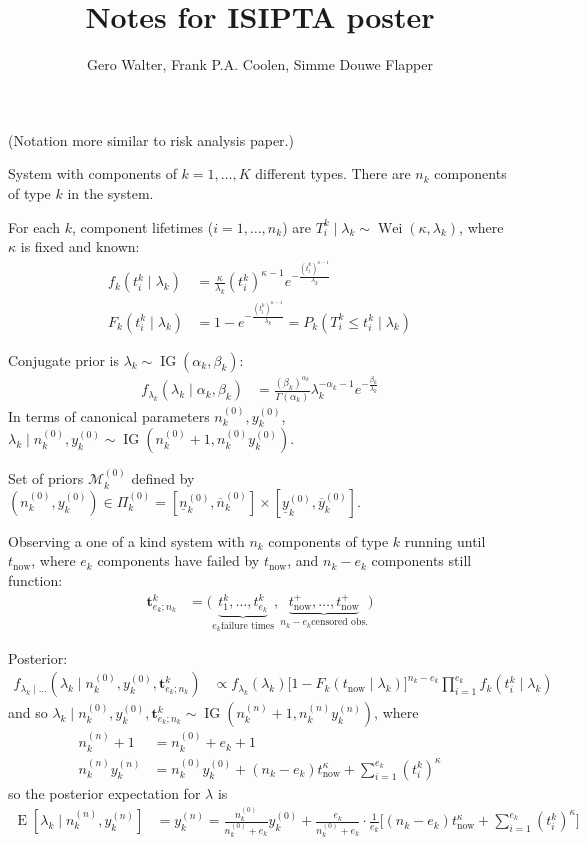 \documentclass[12pt,a4paper,fleqn]{narms}
\title{Notes for ISIPTA poster}
\author{Gero Walter, Frank P.A. Coolen, Simme Douwe Flapper}
\newcommand{\mbf}[1]{\mathbf{#1}}
\newcommand{\uz}{^{(0)}} %
\newcommand{\un}{^{(n)}} %
\newcommand{\ul}[1]{\underline{#1}}
\newcommand{\ol}[1]{\overline{#1}}
\newcommand{\E}{\operatorname{E}}
\newcommand{\wei}{\operatorname{Wei}} %
\newcommand{\ig}{\operatorname{IG}}   %
\def\ykz{y\uz_k}
\def\ykn{y\un_k}
\def\ykzl{\ul{y}\uz_k}
\def\ykzu{\ol{y}\uz_k}
\def\nkz{n\uz_k}
\def\nkn{n\un_k}
\def\nkzl{\ul{n}\uz_k}
\def\nkzu{\ol{n}\uz_k}
\def\MkZ{\mathcal{M}\uz_k}
\def\PkZ{\Pi\uz_k}
\def\tnow{t_\text{now}}
\def\tpnow{t^+_\text{now}}
\begin{document}
\maketitle

(Notation more similar to risk analysis paper.)

System with components of $k=1,\ldots,K$ different types.
There are $n_k$ components of type $k$ in the system.

For each $k$, component lifetimes ($i=1,\ldots,n_k$) are $T_i^k \mid \lambda_k \sim \wei(\kappa,\lambda_k)$,
where $\kappa$ is fixed and known:
\begin{align}
f_k(t_i^k \mid \lambda_k) &= \frac{\kappa}{\lambda_k} (t_i^k)^{\kappa-1} e^{-\frac{(t_i^k)^{\kappa-1}}{\lambda_k}} \\
F_k(t_i^k \mid \lambda_k) &= 1 - e^{-\frac{(t_i^k)^{\kappa-1}}{\lambda_k}} = P_k(T_i^k \leq t_i^k \mid \lambda_k)
\end{align}

Conjugate prior is $\lambda_k \sim \ig(\alpha_k,\beta_k)$:
\begin{align}
f_{\lambda_k}(\lambda_k\mid \alpha_k,\beta_k) &= \frac{(\beta_k)^{\alpha_k}}{\Gamma(\alpha_k)} \lambda_k^{-\alpha_k -1} e^{-\frac{\beta_k}{\lambda_k}}
\end{align}
In terms of canonical parameters $\nkz,\ykz$, $\lambda_k \mid \nkz,\ykz \sim \ig(\nkz + 1, \nkz\ykz)$.

Set of priors $\MkZ$ defined by $(\nkz,\ykz) \in \PkZ = [\nkzl,\nkzu] \times [\ykzl,\ykzu]$.

Observing a one of a kind system with $n_k$ components of type $k$ running until $\tnow$,
where $e_k$ components have failed by $\tnow$, and $n_k - e_k$ components still function:
\begin{align}
\mbf{t}^k_{e_k;n_k} &= \big( \underbrace{t^k_1, \ldots, t^k_{e_k}}_{e_k \text{failure times}},
                             \underbrace{\tpnow, \ldots, \tpnow}_{n_k-e_k \text{censored obs.}} \big)
\end{align}

Posterior:
\begin{align}
f_{\lambda_k\mid\ldots}(\lambda_k\mid\nkz,\ykz,\mbf{t}^k_{e_k;n_k})
 &\propto f_{\lambda_k}(\lambda_k)
          \big[ 1- F_k(\tnow\mid\lambda_k) \big]^{n_k-e_k}
          \prod_{i=1}^{e_k} f_k(t_i^k \mid \lambda_k) 
\end{align}
and so $\lambda_k\mid\nkz,\ykz,\mbf{t}^k_{e_k;n_k} \sim \ig(\nkn + 1, \nkn\ykn)$, where
\begin{align}
\nkn + 1 &= \nkz + e_k + 1 \\
\nkn\ykn &= \nkz\ykz + (n_k-e_k) \tnow^\kappa + \sum_{i=1}^{e_k} (t_i^k)^\kappa
\end{align}
so the posterior expectation for $\lambda$ is
\begin{align}
\E[\lambda_k\mid\nkn,\ykn] &= \ykn
                            = \frac{\nkz}{\nkz + e_k} \ykz +
                              \frac{e_k}{\nkz + e_k} \cdot \frac{1}{e_k}\Big[(n_k-e_k) \tnow^\kappa + \sum_{i=1}^{e_k} (t_i^k)^\kappa \Big]
\end{align}
\end{document}
